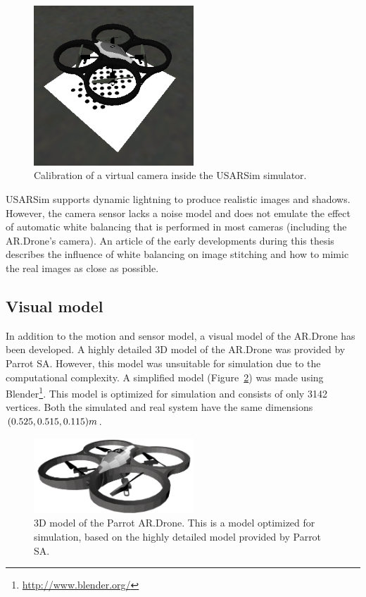 \begin{figure}[htb!]
\centering
\includegraphics[width=6cm]{images/usarsim_camera_calibration.png}
\caption{Calibration of a virtual camera inside the USARSim simulator.} 
\label{fig:3Dmodel}
\end{figure}

USARSim supports dynamic lightning to produce realistic images and shadows.
However, the camera sensor lacks a noise model and does not emulate the effect of automatic white balancing that is performed in most cameras (including the AR.Drone's camera).
An article of the early developments during this thesis \cite{Visser2011imav} describes the influence of white balancing on image stitching and how to mimic the real images as close as possible.


		\subsection{Visual model}
In addition to the motion and sensor model, a visual model of the AR.Drone has been developed.
A highly detailed 3D model of the AR.Drone was provided by Parrot SA.
However, this model was unsuitable for simulation due to the computational complexity.
A simplified model (Figure~\ref{fig:3Dmodel}) was made using Blender\footnote{\url{http://www.blender.org/}}.
This model is optimized for simulation and consists of only 3142 vertices.
Both the simulated and real system have the same dimensions $(0.525,0.515,0.115)\small{m}$.

\begin{figure}[htb!]
\centering
\includegraphics[width=6cm]{images/ardrone_blender_final.png}
\caption{3D model of the Parrot AR.Drone. This is a model optimized for simulation, based on the highly detailed model provided by Parrot SA.} 
\label{fig:3Dmodel}
\end{figure}


